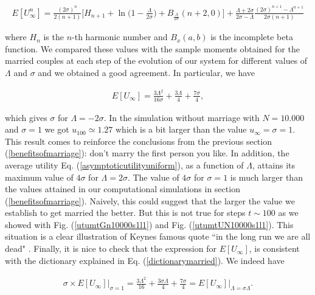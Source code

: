 \documentclass[12pt]{article}
\begin{document}
\begin{align}
    E[U_\infty^n]=\frac{ (2\sigma)^n }{2(n+1)}\big[H_{n+1}+\ln \big(1-\tfrac{\Lambda}{2\sigma} \big)+ B_{\frac{\Lambda }{2\sigma}}(n+2,0)\big]+\frac{\Lambda+2\sigma}{2\sigma-\Lambda}\frac{(2\sigma)^{n+1}-\Lambda^{n+1}}{2\sigma(n+1)}
\end{align}

\noindent where $H_n$ is the $n$-th harmonic number and $B_x(a,b)$ is the incomplete beta function. We compared these values with the sample moments obtained for the married couples at each step of the evolution of our system for different values of $\Lambda$ and    $\sigma$ and we obtained a good agreement. In particular, we have

\begin{align}
    E[U_\infty]=\frac{3 \Lambda ^2}{16 \sigma }+\frac{3 \Lambda }{4}+\frac{7 \sigma }{4},
    \label{asymptoticutilityuniform}
\end{align}

\noindent which gives $\sigma$ for $\Lambda=-2\sigma$. In the simulation without marriage with $N=10.000$ and $\sigma=1$ we got $u_{100}\simeq1.27$ which is a bit larger than the value $u_\infty=\sigma=1$. This result comes to reinforce the conclusions from the previous section (\ref{benefitsofmarriage}): don't marry the first person you like. In addition, the average utility Eq. (\ref{asymptoticutilityuniform}), as a function of $\Lambda$, attains its maximum value of $4\sigma$ for $\Lambda=2\sigma$. The value of $4\sigma$ for $\sigma=1$ is much larger than the values attained in our computational simulations in section (\ref{benefitsofmarriage}). Naively, this could suggest that the larger the value we establish to get married the better. But this is not true for steps $t\sim100$ as we showed with Fig. (\ref{utumtGn10000s1l1}) and Fig. (\ref{utumtUN10000s1l1}). This situation is a clear illustration of Keynes famous quote ``in the long run we are all dead" \cite{keynes1923tract}. Finally, it is nice to check that the expression for $E[U_\infty]$, is consistent with the dictionary explained in Eq. (\ref{dictionarymarried}). We indeed have


\begin{align}
    \sigma \times E[U_\infty]\Big\vert_{\sigma=1}=\frac{3\Lambda^2}{16}+\frac{3\sigma\Lambda}{4}+\frac{7\sigma}{4}=E[U_{\infty}]\Big\vert_{\Lambda=\sigma\Lambda}.
\end{align}


\end{document}
